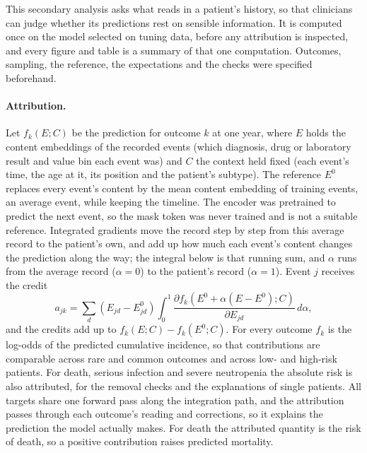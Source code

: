 

This secondary analysis asks what \opera{} reads in a patient's
history, so that clinicians can judge whether its predictions rest on sensible
information. It is computed once on the model selected on tuning data, before
any attribution is inspected, and every figure and table is a summary of that
one computation. Outcomes, sampling, the reference, the expectations and the
checks were specified beforehand.

\paragraph{Attribution.} Let $f_{k}(E;C)$ be the prediction for outcome $k$ at
one year, where $E$ holds the content embeddings of the recorded events (which
diagnosis, drug or laboratory result and value bin each event was) and $C$ the
context held fixed (each event's time, the age at it, its position and the
patient's subtype). The reference $E^0$ replaces every event's content by the
mean content embedding of training events, an average event, while keeping the
timeline. The encoder was pretrained to predict the next event, so the mask
token was never trained and is not a suitable reference. Integrated gradients
\citep{sundararajan2017ig} move the record step by step from this average
record to the patient's own, and add up how much each event's content changes
the prediction along the way; the integral below is that running sum, and
$\alpha$ runs from the average record ($\alpha=0$) to the patient's record
($\alpha=1$). Event $j$ receives the credit
\begin{equation}
 a_{jk}=\sum_d(E_{jd}-E^0_{jd})
 \int_0^1\frac{\partial f_{k}(E^0+\alpha(E-E^0);C)}
 {\partial E_{jd}}\,d\alpha ,
\end{equation}
and the credits add up to $f_k(E;C)-f_k(E^0;C)$. For every outcome $f_k$ is the
log-odds of the predicted cumulative incidence, so that contributions are
comparable across rare and common outcomes and across low- and high-risk
patients. For death, serious infection and severe neutropenia the absolute risk
is also attributed, for the removal checks and the explanations of single
patients. All targets share one forward pass along the
integration path, and the attribution passes through each outcome's reading
and corrections, so it explains the prediction the model actually makes. For death the attributed
quantity is the risk of death, so a positive contribution raises predicted
mortality.

